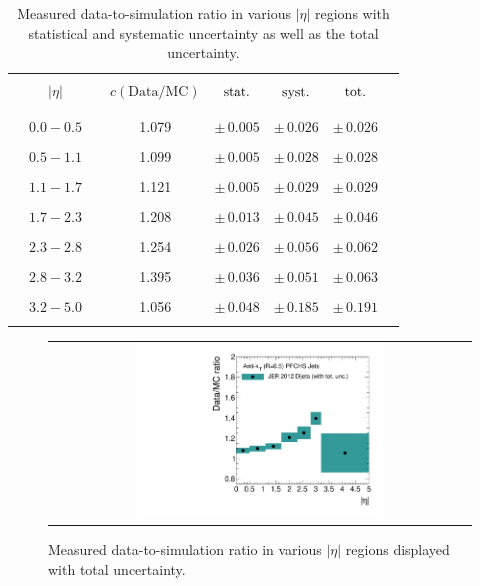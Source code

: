 \begin{table}[!hp]
\centering
\caption{Measured data-to-simulation ratio in various $|\eta|$ regions with statistical and systematic uncertainty as well as the total uncertainty.}
\label{tab:result}
\begin{tabular}{cccc|cc|cc}
\hline
 & & & & & & &\\
 & $|\eta|$ & & $c\mathrm{(Data/MC)}$ & $\rm{stat.}$ & $\rm{syst.}$ & $\rm{tot.}$\\
 & & & & & & &\\
\hline
 & & & & & & &\\
 & $0.0 - 0.5$ & & 1.079 & $\pm \, 0.005$ & $\pm \, 0.026$ & $\pm \, 0.026$ \\
 & & & & & & &\\
 & $0.5 - 1.1$ & & 1.099 & $\pm \, 0.005$ & $\pm \, 0.028$ & $\pm \, 0.028$ \\
 & & & & & & &\\
 & $1.1 - 1.7$ & & 1.121 & $\pm \, 0.005$ & $\pm \, 0.029$ & $\pm \, 0.029$ \\
 & & & & & & &\\
 & $1.7 - 2.3$ & & 1.208 & $\pm \, 0.013$ & $\pm \, 0.045$ & $\pm \, 0.046$ \\
 & & & & & & &\\
 & $2.3 - 2.8$ & & 1.254 & $\pm \, 0.026$ & $\pm \, 0.056$ & $\pm \, 0.062$ \\
 & & & & & & &\\
 & $2.8 - 3.2$ & & 1.395 & $\pm \, 0.036$ & $\pm \, 0.051$ & $\pm \, 0.063$ \\
 & & & & & & &\\
 & $3.2 - 5.0$ & & 1.056 & $\pm \, 0.048$ & $\pm \, 0.185$ & $\pm \, 0.191$ \\
 & & & & & & &\\
\hline
\end{tabular}%
\end{table} 

\begin{figure}[!hp]
  \centering
  \begin{tabular}{c}
                \includegraphics[width=0.6\textwidth]{figures/JER_2012_final_combination_v1.pdf}
  \end{tabular}
  \caption{Measured data-to-simulation ratio in various $|\eta|$ regions displayed with total uncertainty.}
  \label{fig:result_2012}
\end{figure}
 
